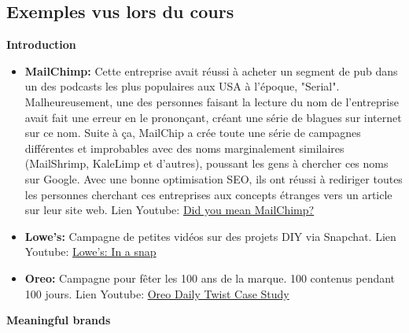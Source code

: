 \newpage

\subsection{Exemples vus lors du cours}

\textbf{Introduction}

\begin{itemize}
    \item \textbf{MailChimp:} Cette entreprise avait réussi à acheter un segment de pub dans un des podcasts les plus populaires aux USA à l'époque, "Serial". Malheureusement, une des personnes faisant la lecture du nom de l'entreprise avait fait une erreur en le prononçant, créant une série de blagues sur internet sur ce nom. Suite à ça, MailChip a crée toute une série de campagnes différentes et improbables avec des noms marginalement similaires (MailShrimp, KaleLimp et d'autres), poussant les gens à chercher ces noms sur Google. Avec une bonne optimisation SEO, ils ont réussi à rediriger toutes les personnes cherchant ces entreprises aux concepts étranges vers un article sur leur site web. Lien Youtube: \href{https://www.youtube.com/watch?v=L4KnG4iZMnk}{Did you mean MailChimp?}
    \item \textbf{Lowe's:} Campagne de petites vidéos sur des projets DIY via Snapchat. Lien Youtube: \href{https://www.youtube.com/watch?v=09nW0CubawE}{Lowe's: In a snap}
    \item \textbf{Oreo:} Campagne pour fêter les 100 ans de la marque. 100 contenus pendant 100 jours. Lien Youtube: \href{https://www.youtube.com/watch?v=ZDSc0V3AEnk}{Oreo Daily Twist Case Study}\\
\end{itemize}


\textbf{Meaningful brands}


